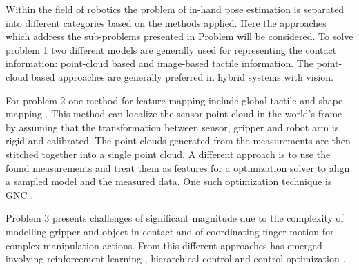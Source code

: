 \documentclass{article}
\begin{document}
Within the field of robotics the problem of in-hand pose estimation is separated into different categories based on the methods applied. Here the approaches which address the sub-problems presented in Problem will be considered. To solve problem 1 two different models are generally used for representing the contact information: point-cloud based\cite{tracking-objects-with-point-clouds-from-vision-and-touch} and image-based \cite{tactile-mapping-and-localization-from-high-resolution-tactile-imprints} tactile information. The point-cloud based approaches are generally preferred in hybrid systems with vision.\par
For problem 2 one method for feature mapping include global tactile and shape mapping \cite{tactile-mapping-and-localization-from-high-resolution-tactile-imprints}. This method can localize the sensor point cloud in the world’s frame by assuming that the transformation between sensor, gripper and robot arm is rigid and calibrated. The point clouds generated from the measurements are then stitched together into a single point cloud. A different approach is to use the found measurements and treat them as features for a optimization solver to align a sampled model and the measured data. One such optimization technique is GNC \cite{graduated-non-convexity-for-robust-spatial-perception}. \par
Problem 3 presents challenges of significant magnitude due to the complexity of modelling gripper and object in contact and of coordinating finger motion for complex manipulation actions. From this different approaches has emerged involving reinforcement learning \cite{learning-dexterous-in-hand-manipulation}, hierarchical control \cite{learning-hierarchical-control-for-robust-in-hand-manipulation} and control optimization \cite{planning-in-hand-object-manipulation-with-multiﬁngered-hands-considering-task-constraints}.


\end{document}
